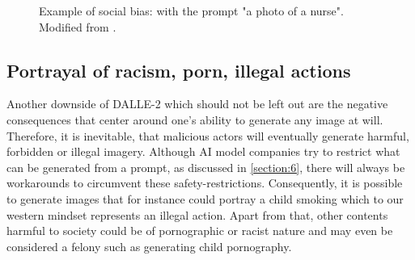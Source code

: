 \documentclass[10pt,twocolumn,twoside]{osajnl}
\begin{document}
\begin{figure}[htbp]
	\centering
	\caption{Example of social bias: with the prompt "a photo of a nurse". Modified from \cite{DallEval}.}
	\label{PhotoOfANurse}
\end{figure}


\subsection{Portrayal of racism, porn, illegal actions}
Another downside of DALLE-2 which should not be left out are the negative consequences that center around one's ability to generate any image at will. 
Therefore, it is inevitable, that malicious actors will eventually generate harmful, forbidden or illegal imagery. 
Although AI model companies try to restrict what can be generated from a prompt, as discussed in \ref{section:6}, there will always be workarounds to circumvent these safety-restrictions.
Consequently, it is possible to generate images that for instance could portray a child smoking which to our western mindset represents an illegal action. 
Apart from that, other contents harmful to society could be of pornographic or racist nature and may even be considered a felony such as generating child pornography. 
\end{document}
